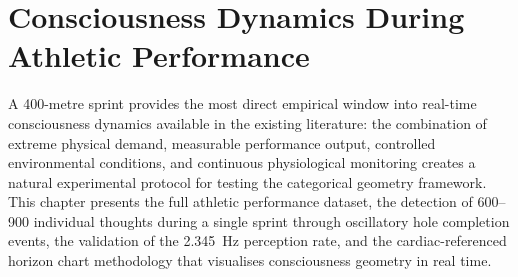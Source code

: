 \chapter{Consciousness Dynamics During Athletic Performance}
\label{ch:athletic_validation}


\begin{chapterabstract}
A 400-metre sprint provides the most direct empirical window into real-time consciousness dynamics available in the existing literature: the combination of extreme physical demand, measurable performance output, controlled environmental conditions, and continuous physiological monitoring creates a natural experimental protocol for testing the categorical geometry framework. This chapter presents the full athletic performance dataset, the detection of 600--900 individual thoughts during a single sprint through oscillatory hole completion events, the validation of the 2.345~Hz perception rate, and the cardiac-referenced horizon chart methodology that visualises consciousness geometry in real time.
\end{chapterabstract}


